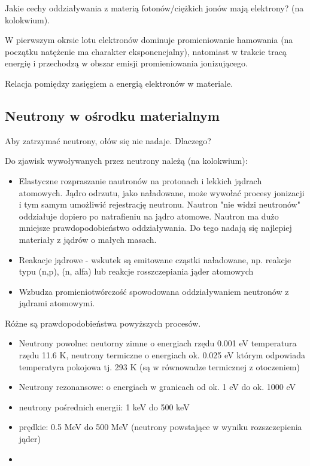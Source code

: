 \documentclass{article}
\begin{document}
Jakie cechy oddziaływania z materią fotonów\slash ciężkich jonów mają elektrony? (na kolokwium).

W pierwszym okrsie lotu elektronów dominuje promieniowanie hamowania (na początku natężenie ma charakter eksponencjalny), natomiast w trakcie tracą energię i przechodzą w obszar emisji promieniowania jonizującego.

Relacja pomiędzy zasięgiem a energią elektronów w materiale.

\subsection{Neutrony w ośrodku materialnym}

Aby zatrzymać neutrony, ołów się nie nadaje. Dlaczego?

Do zjawisk wywoływanych przez neutrony należą (na kolokwium):
\begin{itemize}
    \item Elastyczne rozpraszanie nautronów na protonach i lekkich jądrach atomowych. Jądro odrzutu, jako naładowane, może wywołać procesy jonizacji i tym samym umożliwić rejestrację neutronu. Nautron "nie widzi neutronów" oddziałuje dopiero po natrafieniu na jądro atomowe. Nautron ma dużo mniejsze prawdopodobieństwo oddziaływania. Do tego nadają się najlepiej materiały z jądrów o małych masach.
    \item Reakacje jądrowe - wskutek są emitowane cząstki naładowane, np. reakcje typu (n,p), (n, alfa) lub reakcje rosszczepiania jąder atomowych
    \item Wzbudza promieniotwórczość spowodowana oddziaływaniem neutronów z jądrami atomowymi.
\end{itemize}

Różne są prawdopodobieństwa powyższych procesów.

\begin{itemize}
    \item Neutrony powolne: neutorny zimne o energiach rzędu 0.001 eV temperatura rzędu 11.6 K, neutrony termiczne o energiach ok. 0.025 eV którym odpowiada temperatyra pokojowa tj. 293 K (są w równowadze termicznej z otoczeniem)
    \item Neutrony rezonansowe: o energiach w granicach od ok. 1 eV do ok. 1000 eV
    \item neutrony pośrednich energii: 1 keV do 500 keV
    \item prędkie: 0.5 MeV do 500 MeV (neutrony powstające w wyniku rozszczepienia jąder)
    \item 
\end{itemize}
\end{document}
